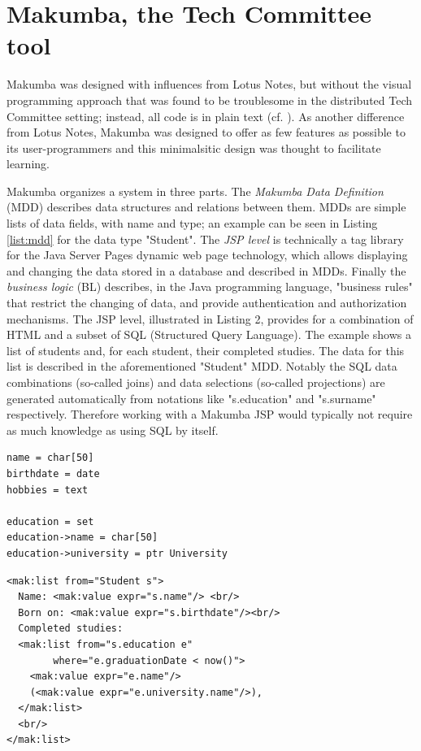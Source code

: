 \documentclass{sig-alt-release2}
\begin{document}
\section{Makumba, the Tech Committee tool}\label{sec:makumba}

Makumba was designed with influences from Lotus Notes, but without the visual programming approach that was found to be troublesome in the distributed Tech Committee setting; instead, all code is in plain text (cf. \cite{yamauchi00}). As another difference from Lotus Notes, Makumba was designed to offer as few features as possible to its user-programmers and this minimalsitic design was thought to facilitate learning. 

Makumba organizes a system in three parts. The \textit{Makumba Data Definition} (MDD) describes data structures and relations between them. MDDs are simple lists of data fields, with name and type; an example can be seen in Listing \ref{list:mdd} for the data type "Student". The \textit{JSP level} is technically a tag library for the Java Server Pages dynamic web page technology, which allows displaying and changing the data stored in a database and described in MDDs. Finally the \textit{business logic} (BL) describes, in the Java programming language, %
"business rules" that restrict the changing of data, and provide authentication and authorization mechanisms. The JSP level, illustrated in Listing 2, provides for a combination of HTML and a subset of SQL (Structured Query Language). The example shows a list of students and, for each student, their completed studies. The data for this list is described in the aforementioned "Student" MDD. Notably the SQL data combinations (so-called joins) and data selections (so-called projections) are generated automatically from notations like "s.education" and "s.surname" respectively. Therefore working with a Makumba JSP would typically not require as much knowledge as using SQL by itself.

\lstset{basicstyle=\small, captionpos=b, caption=Makumba Data Definition "Student", label=list:mdd, frame=shadowbox}
\begin{lstlisting}
name = char[50]
birthdate = date
hobbies = text

education = set
education->name = char[50]
education->university = ptr University
\end{lstlisting}

\lstset{basicstyle=\small, captionpos=b, caption=Example of viewing data with the Makumba JSP tag library, label=list:mak, frame=shadowbox}
\begin{lstlisting}
<mak:list from="Student s">
  Name: <mak:value expr="s.name"/> <br/>
  Born on: <mak:value expr="s.birthdate"/><br/>
  Completed studies:
  <mak:list from="s.education e"
  	    where="e.graduationDate < now()">
    <mak:value expr="e.name"/>
    (<mak:value expr="e.university.name"/>),
  </mak:list>
  <br/>
</mak:list>
\end{lstlisting}
\end{document}
